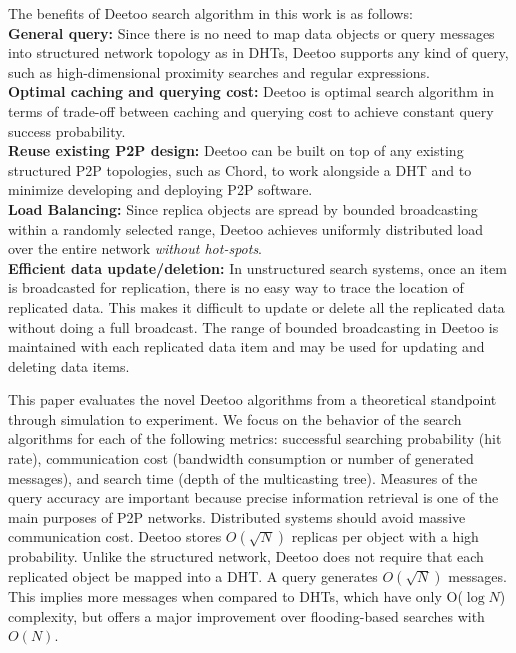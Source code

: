 \documentclass[9.5pt,journal,final,finalsubmission,twocolumn]{IEEEtran}
\begin{document}
The benefits of Deetoo search algorithm in this work is as follows:\\ 
{\bf General query:} Since there is no need to map data objects or query 
messages into structured network topology as in DHTs, Deetoo supports
any kind of query, such as high-dimensional proximity searches and regular 
expressions.\\
{\bf Optimal caching and querying cost:} Deetoo is optimal search algorithm
in terms of trade-off between caching and querying cost to achieve 
constant query success probability.\\
{\bf Reuse existing P2P design:}
Deetoo can be built on top of any existing structured P2P topologies, such as
Chord, to work alongside a DHT and to minimize developing and deploying P2P 
software.\\
{\bf Load Balancing:} 
Since replica objects are spread by bounded broadcasting within 
a randomly selected range, Deetoo achieves uniformly distributed 
load over the entire network \emph{without hot-spots}.\\
{\bf Efficient data update/deletion:} In unstructured search systems, 
once an item is broadcasted for replication, 
there is no easy way to trace the location of replicated data. 
This makes it difficult to update or delete all the replicated data without
doing a full broadcast.
The range of bounded broadcasting in Deetoo is maintained with 
each replicated data item and may be used for updating
and deleting data items.

This paper evaluates the novel Deetoo algorithms from a theoretical 
standpoint through simulation to experiment. 
We focus on the behavior of the search algorithms for each of the
following metrics: successful searching probability (hit rate),
communication cost (bandwidth consumption or number of
generated messages), and search time (depth of the multicasting tree). 
Measures of the query accuracy are important because precise information 
retrieval is one of the main purposes of P2P networks. 
Distributed systems should avoid massive communication cost. Deetoo stores 
$O(\sqrt{N})$ replicas per object with a high probability. 
Unlike the structured network, Deetoo does not require that each replicated object 
be mapped into a DHT.
A query generates $O(\sqrt{N})$ messages.
This implies more messages when compared to DHTs, which have only O($\log N$) complexity,
but offers a major improvement over flooding-based searches with
$O(N)$.
\end{document}
